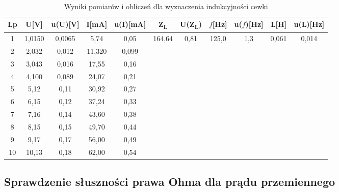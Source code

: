 \documentclass[12pt]{article}
\begin{document}
\begin{table}[h]
    \centering
    \caption{Wyniki pomiarów i obliczeń dla wyznaczenia indukcyjności cewki}
    \label{tab:Wyniki pomiarów i obliczeń}
    \begin{tabular}{|c|c|c|c|c|c|c|c|c|c|c|} \hline
    Lp & U[V] & u(U)[V] & I[mA] & u(I)[mA] & Z\textsubscript{L} & U(Z\textsubscript{L}) & $f$[Hz] & u($f$)[Hz] & L[H] & u(L)[Hz] \\ \hline
    1 & 1,0150 & 0,0065 & 5,74 & 0,05 & \multirow{10}{*}{164,64} & \multirow{10}{*}{0,81} & \multirow{10}{*}{125,0} & \multirow{10}{*}{1,3} & \multirow{10}{*}{0,061} & \multirow{10}{*}{0,014} \\ \cline{1-5}
    2 & 2,032 & 0,012 & 11,320 & 0,099 & ~ & ~ & ~ & ~ & ~ & ~ \\ \cline{1-5}
    3 & 3,043 & 0,016 & 17,55 & 0,16 & ~ & ~ & ~ & ~ & ~ & ~ \\ \cline{1-5}
    4 & 4,100 & 0,089 & 24,07 & 0,21 & ~ & ~ & ~ & ~ & ~ & ~ \\ \cline{1-5}
    5 & 5,12 & 0,11 & 30,92 & 0,27 & ~ & ~ & ~ & ~ & ~ & ~ \\ \cline{1-5}
    6 & 6,15 & 0,12 & 37,24 & 0,33 & ~ & ~ & ~ & ~ & ~ & ~ \\ \cline{1-5}
    7 & 7,16 & 0,14 & 43,60 & 0,38 & ~ & ~ & ~ & ~ & ~ & ~ \\ \cline{1-5}
    8 & 8,15 & 0,15 & 49,70 & 0,44 & ~ & ~ & ~ & ~ & ~ & ~ \\ \cline{1-5}
    9 & 9,17 & 0,17 & 56,00 & 0,49 & ~ & ~ & ~ & ~ & ~ & ~ \\ \cline{1-5}
    10 & 10,13 & 0,18 & 62,00 & 0,54 & ~ & ~ & ~ & ~ & ~ & ~ \\ \hline
    \end{tabular}
\end{table}

\subsection{Sprawdzenie słuszności prawa Ohma dla prądu przemiennego}
\end{document}
